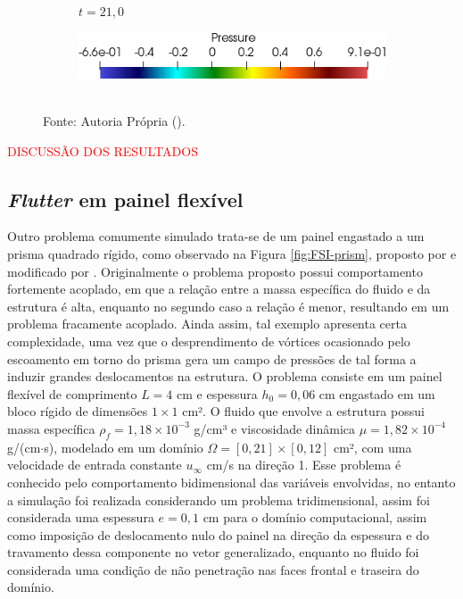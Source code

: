 \begin{figure}[h!]
\begin{subfigure}[b]{0.3\textwidth}
        \caption{$t=21,0$}
    \end{subfigure}
    \begin{subfigure}[b]{0.4\textwidth}
        \includegraphics[width=\linewidth]{Figuras/FSI-Cavity2D/legenda.png}
    \end{subfigure}
    \\Fonte: Autoria Própria (\the\year).
    \label{fig:cavity2D-time}
\end{figure}

\textcolor{red}{DISCUSSÃO DOS RESULTADOS}

\subsection{\textit{Flutter} em painel flexível}

Outro problema comumente simulado trata-se de um painel engastado a um prisma quadrado rígido, como observado na Figura \ref{fig:FSI-prism}, proposto por  e modificado por . Originalmente o problema proposto possui comportamento fortemente acoplado, em que a relação entre a massa específica do fluido e da estrutura é alta, enquanto no segundo caso a relação é menor, resultando em um problema fracamente acoplado. Ainda assim, tal exemplo apresenta certa complexidade, uma vez que o desprendimento de vórtices ocasionado pelo escoamento em torno do prisma gera um campo de pressões de tal forma a induzir grandes deslocamentos na estrutura. O problema consiste em um painel flexível de comprimento $L=4$ cm e espessura $h_0=0,06$ cm engastado em um bloco rígido de dimensões $1\times 1$ cm². O fluido que envolve a estrutura possui massa específica $\rho_f=1,18\times10^{-3}$ g/cm³ e viscosidade dinâmica $\mu=1,82\times10^{-4}$ g/(cm$\cdot$s), modelado em um domínio $\Omega=[0,21]\times[0,12]$ cm², com uma velocidade de entrada constante $u_\infty$ cm/s na direção 1. Esse problema é conhecido pelo comportamento bidimensional das variáveis envolvidas, no entanto a simulação foi realizada considerando um problema tridimensional, assim foi considerada uma espessura $e=0,1$ cm para o domínio computacional, assim como imposição de deslocamento nulo do painel na direção da espessura e do travamento dessa componente no vetor generalizado, enquanto no fluido foi considerada uma condição de não penetração nas faces frontal e traseira do domínio.

